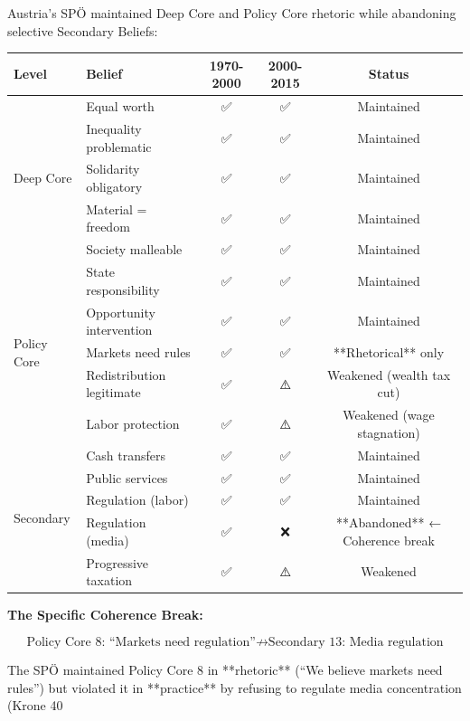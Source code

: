 Austria's SPÖ maintained Deep Core and Policy Core rhetoric while abandoning selective Secondary Beliefs:

\begin{table}[h]
\centering
\small
\renewcommand{\arraystretch}{1.4}
\begin{tabular}{@{}llccc@{}}
\toprule
\textbf{Level} & \textbf{Belief} & \textbf{1970-2000} & \textbf{2000-2015} & \textbf{Status} \\
\midrule
\multirow{5}{*}{Deep Core} & Equal worth & ✅ & ✅ & Maintained \\
& Inequality problematic & ✅ & ✅ & Maintained \\
& Solidarity obligatory & ✅ & ✅ & Maintained \\
& Material = freedom & ✅ & ✅ & Maintained \\
& Society malleable & ✅ & ✅ & Maintained \\
\midrule
\multirow{5}{*}{Policy Core} & State responsibility & ✅ & ✅ & Maintained \\
& Opportunity intervention & ✅ & ✅ & Maintained \\
& Markets need rules & ✅ & ✅ & **Rhetorical** only \\
& Redistribution legitimate & ✅ & ⚠️ & Weakened (wealth tax cut) \\
& Labor protection & ✅ & ⚠️ & Weakened (wage stagnation) \\
\midrule
\multirow{5}{*}{Secondary} & Cash transfers & ✅ & ✅ & Maintained \\
& Public services & ✅ & ✅ & Maintained \\
& Regulation (labor) & ✅ & ✅ & Maintained \\
& Regulation (media) & ✅ & ❌ & **Abandoned** ← Coherence break \\
& Progressive taxation & ✅ & ⚠️ & Weakened \\
\bottomrule
\end{tabular}
\end{table}

\textbf{The Specific Coherence Break:}

\begin{equation}
\text{Policy Core 8: ``Markets need regulation''} \not\rightarrow \text{Secondary 13: Media regulation}
\end{equation}

The SPÖ maintained Policy Core 8 in **rhetoric** (``We believe markets need rules'') but violated it in **practice** by refusing to regulate media concentration (Krone 40%

